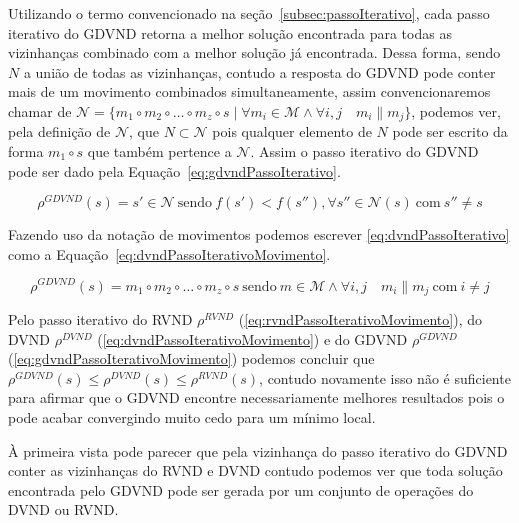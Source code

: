 Utilizando o termo convencionado na seção~\ref{subsec:passoIterativo}, cada passo iterativo do GDVND retorna a melhor solução encontrada para todas as vizinhanças combinado com a melhor solução já encontrada.
Dessa forma, sendo $N$ a união de todas as vizinhanças, contudo a resposta do GDVND pode conter mais de um movimento combinados simultaneamente, assim convencionaremos chamar de $\mathcal{N} = \{ m_1 \circ m_2 \circ \dots \circ m_z \circ s \mid \forall m_i \in \mathcal{M} \land \forall i, j \quad m_i \parallel m_j \}$, podemos ver, pela definição de $\mathcal{N}$, que $N \subset \mathcal{N}$ pois qualquer elemento de $N$ pode ser escrito da forma $m_1 \circ s$ que também pertence a $\mathcal{N}$.
Assim o passo iterativo do GDVND pode ser dado pela Equação~\ref{eq:gdvndPassoIterativo}.

\begin{equation} \label{eq:gdvndPassoIterativo}
\rho^{GDVND}(s) = s' \in \mathcal{N} \  \textrm{sendo} \  f(s') < f(s''), \forall s'' \in \mathcal{N}(s) \  \textrm{com} \  s'' \ne s
\end{equation}

Fazendo uso da notação de movimentos podemos escrever \ref{eq:dvndPassoIterativo} como a Equação~\ref{eq:dvndPassoIterativoMovimento}.

\begin{equation} \label{eq:gdvndPassoIterativoMovimento}
\rho^{GDVND}(s) = m_1 \circ m_2 \circ \dots \circ m_z \circ s \  \textrm{sendo} \  m \in \mathcal{M} \land \forall i,j \quad m_i \parallel m_j \  \textrm{com} \  i \ne j
\end{equation}

Pelo passo iterativo do RVND $\rho^{RVND}$ (\ref{eq:rvndPassoIterativoMovimento}), do DVND $\rho^{DVND}$ (\ref{eq:dvndPassoIterativoMovimento}) e do GDVND $\rho^{GDVND}$ (\ref{eq:gdvndPassoIterativoMovimento}) podemos concluir que $\rho^{GDVND}(s) \le \rho^{DVND}(s) \le \rho^{RVND}(s)$, contudo novamente isso não é suficiente para afirmar que o GDVND encontre necessariamente melhores resultados pois o pode acabar convergindo muito cedo para um mínimo local.

À primeira vista pode parecer que pela vizinhança do passo iterativo do GDVND conter as vizinhanças do RVND e DVND contudo podemos ver que toda solução encontrada pelo GDVND pode ser gerada por um conjunto de operações do DVND ou RVND.

